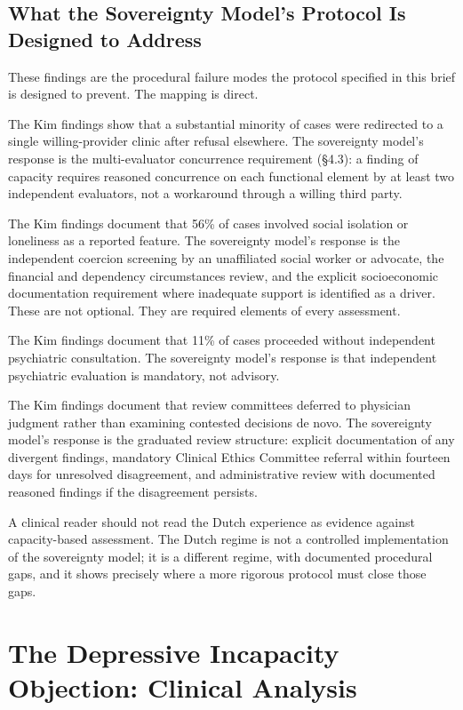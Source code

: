 \documentclass[11pt, letterpaper]{article}
\begin{document}
\subsection{What the Sovereignty Model's Protocol Is Designed to Address}

These findings are the procedural failure modes the protocol specified in this brief
is designed to prevent. The mapping is direct.

The Kim findings show that a substantial minority of cases were redirected to a single
willing-provider clinic after refusal elsewhere. The sovereignty model's response is
the multi-evaluator concurrence requirement (\S 4.3): a finding of capacity requires
reasoned concurrence on each functional element by at least two independent evaluators,
not a workaround through a willing third party.

The Kim findings document that 56\% of cases involved social isolation or loneliness as
a reported feature. The sovereignty model's response is the independent coercion
screening by an unaffiliated social worker or advocate, the financial and dependency
circumstances review, and the explicit socioeconomic documentation requirement where
inadequate support is identified as a driver. These are not optional. They are
required elements of every assessment.

The Kim findings document that 11\% of cases proceeded without independent psychiatric
consultation. The sovereignty model's response is that independent psychiatric
evaluation is mandatory, not advisory.

The Kim findings document that review committees deferred to physician judgment rather
than examining contested decisions de novo. The sovereignty model's response is the
graduated review structure: explicit documentation of any divergent findings, mandatory
Clinical Ethics Committee referral within fourteen days for unresolved disagreement,
and administrative review with documented reasoned findings if the disagreement
persists.

A clinical reader should not read the Dutch experience as evidence against
capacity-based assessment. The Dutch regime is not a controlled implementation of the
sovereignty model; it is a different regime, with documented procedural gaps, and it
shows precisely where a more rigorous protocol must close those gaps.

\section{The Depressive Incapacity Objection: Clinical Analysis}
\end{document}
